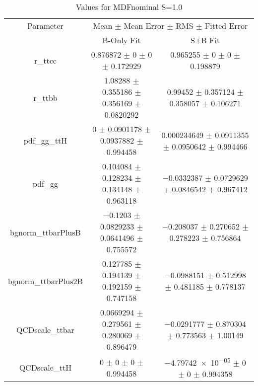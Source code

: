 \begin{table}
\centering
\caption{Values for MDFnominal S=1.0}
\begin{tabular}{ccc}
\toprule
Parameter & \multicolumn{2}{c}{Mean $\pm$ Mean Error $\pm$ RMS $\pm$ Fitted Error}\\
 & B-Only Fit & S+B Fit\\
\midrule
r\_ttcc & \num{0.876872} $\pm$ \num{0} $\pm$ \num{0} $\pm$ \num{0.172929} & \num{0.965255} $\pm$ \num{0} $\pm$ \num{0} $\pm$ \num{0.198879}\\
r\_ttbb & \num{1.08288} $\pm$ \num{0.355186} $\pm$ \num{0.356169} $\pm$ \num{0.0820292} & \num{0.99452} $\pm$ \num{0.357124} $\pm$ \num{0.358057} $\pm$ \num{0.106271}\\
pdf\_gg\_ttH & \num{0} $\pm$ \num{0.0901178} $\pm$ \num{0.0937882} $\pm$ \num{0.994458} & \num{0.000234649} $\pm$ \num{0.0911355} $\pm$ \num{0.0950642} $\pm$ \num{0.994466}\\
pdf\_gg & \num{0.104084} $\pm$ \num{0.128234} $\pm$ \num{0.134148} $\pm$ \num{0.963118} & \num{-0.0332387} $\pm$ \num{0.0729629} $\pm$ \num{0.0846542} $\pm$ \num{0.967412}\\
bgnorm\_ttbarPlusB & \num{-0.1203} $\pm$ \num{0.0829233} $\pm$ \num{0.0641496} $\pm$ \num{0.755572} & \num{-0.208037} $\pm$ \num{0.270652} $\pm$ \num{0.278223} $\pm$ \num{0.756864}\\
bgnorm\_ttbarPlus2B & \num{0.127785} $\pm$ \num{0.194139} $\pm$ \num{0.192159} $\pm$ \num{0.747158} & \num{-0.0988151} $\pm$ \num{0.512998} $\pm$ \num{0.481185} $\pm$ \num{0.778137}\\
QCDscale\_ttbar & \num{0.0669294} $\pm$ \num{0.279561} $\pm$ \num{0.280069} $\pm$ \num{0.896479} & \num{-0.0291777} $\pm$ \num{0.870304} $\pm$ \num{0.773563} $\pm$ \num{1.00149}\\
QCDscale\_ttH & \num{0} $\pm$ \num{0} $\pm$ \num{0} $\pm$ \num{0.994458} & \num{-4.79742e-05} $\pm$ \num{0} $\pm$ \num{0} $\pm$ \num{0.994358}\\
\bottomrule
\end{tabular}
\end{table}